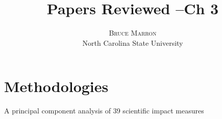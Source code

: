 \documentclass[twoside]{article}	                         %
\title{\vspace{-15mm}\fontsize{14pt}{10pt}\selectfont\textbf{Papers Reviewed --Ch 3}} %
\author{
\large
\textsc{Bruce Marron} \\ %
\normalsize North Carolina State University \\ %
\vspace{-5mm}
}
\date{}
\begin{document}
\maketitle %
\thispagestyle{fancy} %





\section{Methodologies}
\citep{bollen_principal_2009} A principal component analysis of 39 scientific impact measures\\
\end{document}
